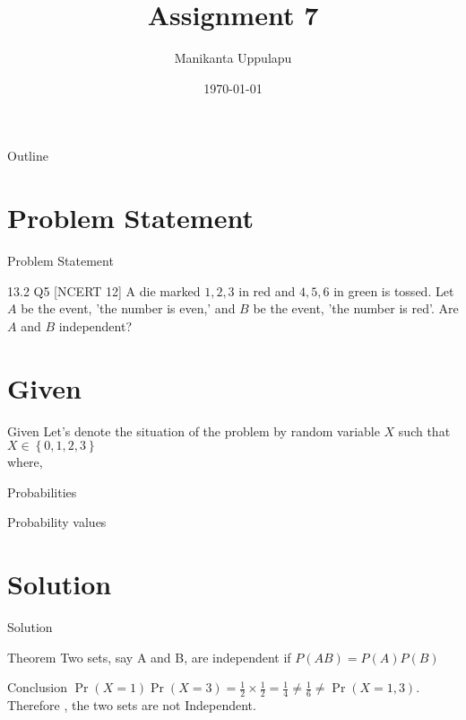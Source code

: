 \documentclass{beamer}
\title{Assignment 7}
\author{Manikanta Uppulapu}
\date{\today}
\providecommand{\cbrak}[1]{\ensuremath{\left\{#1\right\}}}
\providecommand{\cbrak}[1]{\ensuremath{\left\{#1\right\}}}
\begin{document}
\begin{frame}
    \titlepage 
\end{frame}

\logo{}


\begin{frame}{Outline}
    \tableofcontents
\end{frame}



\section{Problem Statement}
\begin{frame}{Problem Statement}
    \begin{block}{13.2 Q5 [NCERT 12] }A die marked $1, 2, 3$ in red and $4, 5, 6$ in green is tossed. Let $A$ be the event, 'the number is even,' and $B$ be the event, 'the number is red'. Are $A$ and $B$ independent?
    \end{block}
\end{frame}



\section{Given}
\begin{frame}{Given}
Let's denote the situation of the problem by random variable $X$  such that $X\in \cbrak{0,1,2,3}$\\
where,\\
\begin{table}[ht!]
    \centering
    
    \caption{}
\label{table:table1}
\end{table}

  
\end{frame}

\begin{frame}{Probabilities}
\begin{table}[ht!]
    \centering
    
    \caption{Probability values}
\label{table:table1}
\end{table}

\end{frame}

\section{Solution}
\begin{frame}{Solution}
\begin{exampleblock}{Theorem}
        Two sets, say A and B, are independent if $P(AB) = P(A)P(B)$
   \end{exampleblock}
   \begin{block}{Conclusion}
        $\Pr(X=1)\Pr(X=3) = \frac{1}{2} \times \frac{1}{2} =   \frac{1}{4} \neq \frac{1}{6} \neq \Pr(X=1,3)$.\\
        Therefore , the two sets are not Independent.
    \end{block}

\end{frame}
\end{document}
